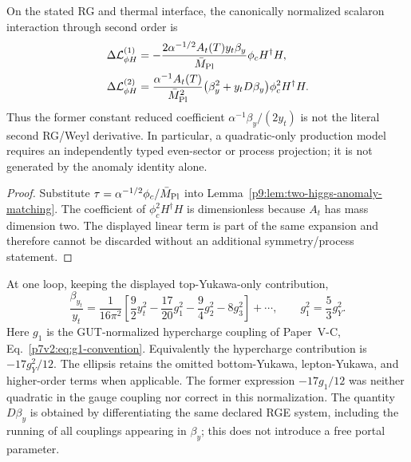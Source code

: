 \documentclass[12pt,a4paper]{article}
\begin{document}
\begin{theorem}
\label{p9:thm:closed-anomaly-portal}
On the stated RG and thermal interface, the canonically normalized scalaron
interaction through second order is
\begin{align}
\Delta\mathcal L_{\phi H}^{(1)}
&=-\frac{2\alpha^{-1/2}A_t(T)y_t\beta_y}{\bar M_{\rm Pl}}
  \phi_c H^\dagger H,\\
\Delta\mathcal L_{\phi H}^{(2)}
&=\frac{\alpha^{-1}A_t(T)}{\bar M_{\rm Pl}^{2}}
  \bigl(\beta_y^2+y_tD\beta_y\bigr)
  \phi_c^2H^\dagger H.
\label{p9:eq:closed-portal}
\end{align}
Thus the former constant reduced coefficient
\(\alpha^{-1}\beta_y/(2y_t)\) is not the literal second RG/Weyl derivative.
In particular, a quadratic-only production model requires an independently
typed even-sector or process projection; it is not generated by the anomaly
identity alone.
\end{theorem}

\begin{proof}
Substitute
\(\tau=\alpha^{-1/2}\phi_c/\bar M_{\rm Pl}\) into
Lemma~\ref{p9:lem:two-higgs-anomaly-matching}.  The coefficient of
\(\phi_c^2H^\dagger H\) is dimensionless because \(A_t\) has mass dimension
two.  The displayed linear term is part of the same expansion and therefore
cannot be discarded without an additional symmetry/process statement.
\end{proof}

\begin{remark}
At one loop, keeping the displayed top-Yukawa-only contribution,
\[
\frac{\beta_{y_t}}{y_t}
=\frac{1}{16\pi^2}
\left[\frac92y_t^2-\frac{17}{20}g_1^2-\frac94g_2^2-8g_3^2\right]+\cdots,
\qquad g_1^2=\frac53g_Y^2.
\]
Here \(g_1\) is the GUT-normalized hypercharge coupling of Paper~V-C,
Eq.~\eqref{p7v2:eq:g1-convention}. Equivalently the hypercharge contribution
is \(-17g_Y^2/12\). The ellipsis retains the omitted bottom-Yukawa,
lepton-Yukawa, and higher-order terms when applicable. The former expression
\(-17g_1/12\) was neither quadratic in the gauge coupling nor correct in
this normalization. The quantity \(D\beta_y\) is obtained by differentiating
the same declared RGE system, including the running of all couplings appearing
in \(\beta_y\); this does not introduce a free portal parameter.
\end{remark}
\end{document}
